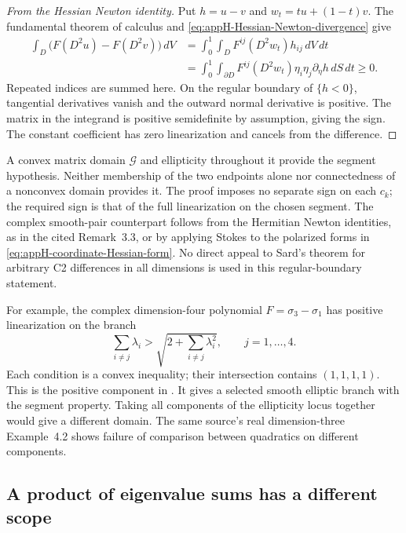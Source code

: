 \begin{proof}[From the Hessian Newton identity]
Put \(h=u-v\) and \(w_t=tu+(1-t)v\). The fundamental theorem
of calculus and \eqref{eq:appH-Hessian-Newton-divergence} give
\[
 \tag{H.11}\label{eq:appH-Newton-boundary-flux}
 \begin{aligned}
 \int_D\bigl(F(D^2u)-F(D^2v)\bigr)\,dV
  &=\int_0^1\int_D F^{ij}(D^2w_t)h_{ij}\,dV\,dt\\
  &=\int_0^1\int_{\partial D}
       F^{ij}(D^2w_t)\eta_i\eta_j\partial_\eta h\,dS\,dt
    \geq0.
 \end{aligned}
\]
Repeated indices are summed here. On the regular boundary of
\(\{h<0\}\), tangential derivatives vanish and the outward
normal derivative is positive. The matrix in the integrand is
positive semidefinite by assumption, giving the sign. The constant
coefficient has zero linearization and cancels from the difference.
\end{proof}

A convex matrix domain \(\mathcal G\) and ellipticity throughout it
provide the segment hypothesis. Neither membership of the two
endpoints alone nor connectedness of a nonconvex domain provides it.
The proof imposes no separate sign on each \(c_k\); the required
sign is that of the full linearization on the chosen segment.
The complex smooth-pair counterpart follows from the Hermitian
Newton identities, as in the cited Remark~3.3, or by applying Stokes
to the polarized forms in \eqref{eq:appH-coordinate-Hessian-form}.
No direct appeal to Sard's theorem for arbitrary C2 differences in
all dimensions is used in this regular-boundary statement.

For example, the complex dimension-four polynomial
\(F=\sigma_3-\sigma_1\) has positive linearization on the branch
\[
 \tag{H.12}\label{eq:appH-critical-polynomial-branch}
 \sum_{i\ne j}\lambda_i>
       \sqrt{2+\sum_{i\ne j}\lambda_i^2},
 \qquad j=1,\ldots,4.
\]
Each condition is a convex inequality; their intersection contains
\((1,1,1,1)\). This is the positive component in
\cite[Example~4.1]{DinewMygaSroka26IntegralV1}. It gives a selected
smooth elliptic branch with the segment property. Taking all
components of the ellipticity locus together would give a different
domain. The same source's real dimension-three Example~4.2 shows
failure of comparison between quadratics on different components.

\subsection{A product of eigenvalue sums has a different scope}
\label{sec:appH-product-eigenvalue-obstruction}

